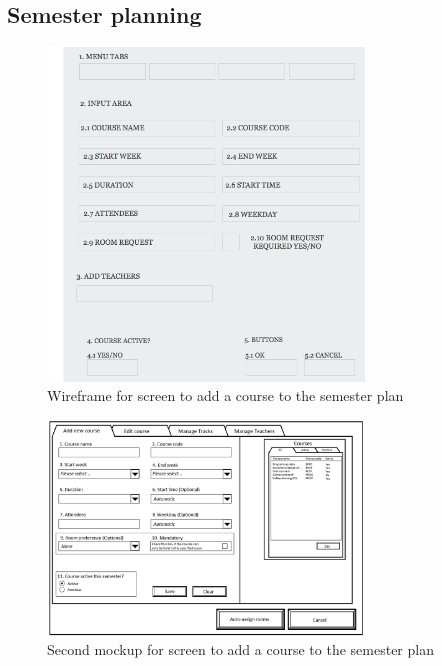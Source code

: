 \pagebreak

\subsection{Semester planning}

\begin{figure}
\begin{center}
\leavevmode
\includegraphics[width=0.75\textwidth]{images/wireframe_courses}
\end{center}
\caption{Wireframe for screen to add a course to the semester plan}
\label{fig:app2_mock1_w}
\end{figure}

\begin{figure}
\begin{center}
\leavevmode
\includegraphics[width=0.75\textwidth]{images/courseplan2_addcourse}
\end{center}
\caption{Second mockup for screen to add a course to the semester plan}
\label{fig:app2_mock2_1}
\end{figure}

